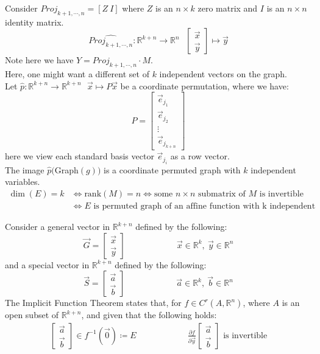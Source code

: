 \documentclass[11pt,oneside]{book}
\theoremstyle{break}
\theoremstyle{break}
\newcommand{\R}{\mathbb{R}}
\begin{document}
Consider $Proj_{k+1,\cdots,n} = [Z\ I]$ where $Z$ is an $n \times k$ zero matrix and $I$ is an $n \times n$ identity matrix. $$\hat{Proj_{k+1,\cdots,n}}:\R^{k+n} \to \R^n \ \ \ \begin{bmatrix}\vec{x}\\\vec{y}\end{bmatrix} \mapsto \vec{y}$$
Note here we have $Y = Proj_{k+1,\cdots,n}\cdot M$.\\

Here, one might want a different set of $k$ independent vectors on the graph.\\ Let $\hat{p}: \R^{k+n} \to \R^{k+n} \ \ \ \vec{x}\mapsto P\vec{x}$ be a coordinate permutation, where we have: 
$$P = \begin{bmatrix}
 \vec{e}_{j_1} \\ \vec{e}_{j_2} \\ \vdots \\ \vec{e}_{j_{k+n}}
\end{bmatrix}$$
here we view each standard basis vector $\vec{e}_{j_i}$ as a row vector.\\
The image $\hat{p}($Graph$(g))$ is a coordinate permuted graph with $k$ independent variables. 
\begin{align*}
\dim(E) = k &\iff \text{rank}(M) = n \iff \text{some }n\times n\text{ submatrix of }M\text{ is invertible}\\
&\iff E\text{ is permuted graph of an affine function with k independent variables}
\end{align*}

Consider a general vector in $\R^{k+n}$ defined by the following:
$$\vec{G} = \begin{bmatrix}
\vec{x} \\ \vec{y}
\end{bmatrix}\qquad\qquad\qquad\vec{x}\in \R^k,\ \vec{y}\in \R^n
$$
and a special vector in $\R^{k+n}$ defined by the following:
$$\vec{S} = \begin{bmatrix}
\vec{a} \\ \vec{b}
\end{bmatrix}\qquad\qquad\qquad\vec{a}\in \R^k,\ \vec{b}\in \R^n
$$
The Implicit Function Theorem states that, for $f \in C^r(A,\R^n)$, where $A$ is an open subset of $\R^{k+n}$, and given that the following holds:
\begin{align*}
\begin{bmatrix}
\vec{a}\\\vec{b}
\end{bmatrix} \in f^{-1}(\vec{0}) \coloneqq E \qquad\qquad\qquad \frac{\partial f}{\partial \vec{y}}\begin{bmatrix}
\vec{a}\\\vec{b}
\end{bmatrix} \text{ is invertible}
\end{align*}
\end{document}
